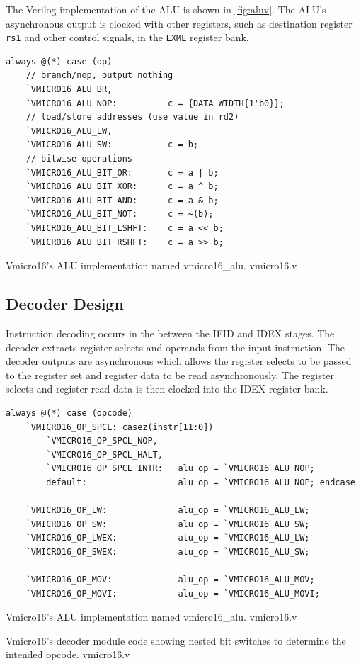 The Verilog implementation of the ALU is shown in \cref{fig:aluv}. The ALU's asynchronous output is clocked with other registers, such as destination register \verb|rs1| and other control signals, in the \verb|EXME| register bank.
\begin{listing}[H]
\centering
\begin{verbatim}
always @(*) case (op)
    // branch/nop, output nothing
    `VMICRO16_ALU_BR,
    `VMICRO16_ALU_NOP:          c = {DATA_WIDTH{1'b0}};
    // load/store addresses (use value in rd2)
    `VMICRO16_ALU_LW,
    `VMICRO16_ALU_SW:           c = b;
    // bitwise operations
    `VMICRO16_ALU_BIT_OR:       c = a | b;
    `VMICRO16_ALU_BIT_XOR:      c = a ^ b;
    `VMICRO16_ALU_BIT_AND:      c = a & b;
    `VMICRO16_ALU_BIT_NOT:      c = ~(b);
    `VMICRO16_ALU_BIT_LSHFT:    c = a << b;
    `VMICRO16_ALU_BIT_RSHFT:    c = a >> b;
\end{verbatim}
\caption{Vmicro16's ALU implementation named vmicro16\_alu. vmicro16.v}
\label{fig:aluv}
\end{listing}




\subsection{Decoder Design}
Instruction decoding occurs in the between the IFID and IDEX stages. 
The decoder extracts register selects and operands from the input instruction. The decoder outputs are asynchronous which allows the register selects to be passed to the register set and register data to be read asynchronously. The register selects and register read data is then clocked into the IDEX register bank.

\begin{listing}[H]
\centering
\begin{verbatim}
always @(*) case (opcode)
    `VMICRO16_OP_SPCL: casez(instr[11:0])
        `VMICRO16_OP_SPCL_NOP,
        `VMICRO16_OP_SPCL_HALT,
        `VMICRO16_OP_SPCL_INTR:   alu_op = `VMICRO16_ALU_NOP;
        default:                  alu_op = `VMICRO16_ALU_NOP; endcase
    
    `VMICRO16_OP_LW:              alu_op = `VMICRO16_ALU_LW;
    `VMICRO16_OP_SW:              alu_op = `VMICRO16_ALU_SW;
    `VMICRO16_OP_LWEX:            alu_op = `VMICRO16_ALU_LW;
    `VMICRO16_OP_SWEX:            alu_op = `VMICRO16_ALU_SW;

    `VMICRO16_OP_MOV:             alu_op = `VMICRO16_ALU_MOV;
    `VMICRO16_OP_MOVI:            alu_op = `VMICRO16_ALU_MOVI;
\end{verbatim}
\caption{Vmicro16's ALU implementation named vmicro16\_alu. vmicro16.v}
\caption{Vmicro16's decoder module code showing nested bit switches to determine the intended opcode. vmicro16.v}
\label{fig:vdecoder}
\end{listing}

